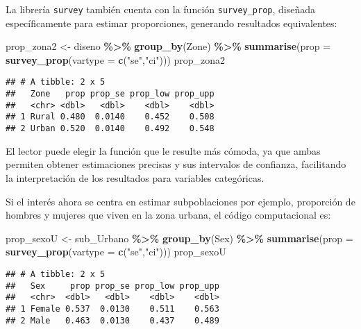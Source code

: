 \documentclass[
  12pt,
]{book}
\newenvironment{Shaded}{\begin{snugshade}}{\end{snugshade}}
\newcommand{\AttributeTok}[1]{\textcolor[rgb]{0.13,0.29,0.53}{#1}}
\newcommand{\FunctionTok}[1]{\textcolor[rgb]{0.13,0.29,0.53}{\textbf{#1}}}
\newcommand{\NormalTok}[1]{#1}
\newcommand{\OtherTok}[1]{\textcolor[rgb]{0.56,0.35,0.01}{#1}}
\newcommand{\SpecialCharTok}[1]{\textcolor[rgb]{0.81,0.36,0.00}{\textbf{#1}}}
\newcommand{\StringTok}[1]{\textcolor[rgb]{0.31,0.60,0.02}{#1}}
\begin{document}
La librería \texttt{survey} también cuenta con la función \texttt{survey\_prop}, diseñada específicamente para estimar proporciones, generando resultados equivalentes:

\begin{Shaded}
\begin{Highlighting}[]
\NormalTok{prop\_zona2 }\OtherTok{\textless{}{-}}\NormalTok{ diseno }\SpecialCharTok{\%\textgreater{}\%} \FunctionTok{group\_by}\NormalTok{(Zone) }\SpecialCharTok{\%\textgreater{}\%} 
               \FunctionTok{summarise}\NormalTok{(}\AttributeTok{prop =} \FunctionTok{survey\_prop}\NormalTok{(}\AttributeTok{vartype =} \FunctionTok{c}\NormalTok{(}\StringTok{"se"}\NormalTok{,}\StringTok{"ci"}\NormalTok{)))}
\NormalTok{prop\_zona2}
\end{Highlighting}
\end{Shaded}

\begin{verbatim}
## # A tibble: 2 x 5
##   Zone   prop prop_se prop_low prop_upp
##   <chr> <dbl>   <dbl>    <dbl>    <dbl>
## 1 Rural 0.480  0.0140    0.452    0.508
## 2 Urban 0.520  0.0140    0.492    0.548
\end{verbatim}

El lector puede elegir la función que le resulte más cómoda, ya que ambas permiten obtener estimaciones precisas y sus intervalos de confianza, facilitando la interpretación de los resultados para variables categóricas.

Si el interés ahora se centra en estimar subpoblaciones por ejemplo, proporción de hombres y mujeres que viven en la zona urbana, el código computacional es:

\begin{Shaded}
\begin{Highlighting}[]
\NormalTok{prop\_sexoU }\OtherTok{\textless{}{-}}\NormalTok{ sub\_Urbano }\SpecialCharTok{\%\textgreater{}\%} \FunctionTok{group\_by}\NormalTok{(Sex) }\SpecialCharTok{\%\textgreater{}\%} 
              \FunctionTok{summarise}\NormalTok{(}\AttributeTok{prop =} \FunctionTok{survey\_prop}\NormalTok{(}\AttributeTok{vartype =} \FunctionTok{c}\NormalTok{(}\StringTok{"se"}\NormalTok{,}\StringTok{"ci"}\NormalTok{)))}
\NormalTok{prop\_sexoU}
\end{Highlighting}
\end{Shaded}

\begin{verbatim}
## # A tibble: 2 x 5
##   Sex     prop prop_se prop_low prop_upp
##   <chr>  <dbl>   <dbl>    <dbl>    <dbl>
## 1 Female 0.537  0.0130    0.511    0.563
## 2 Male   0.463  0.0130    0.437    0.489
\end{verbatim}
\end{document}
